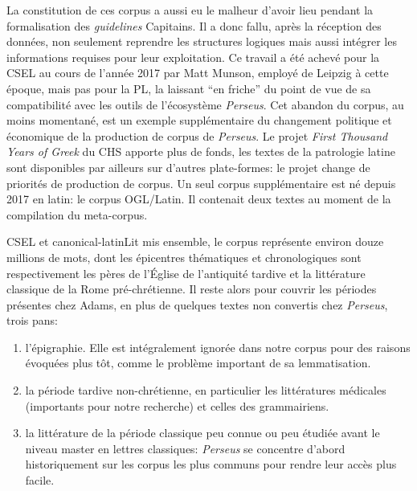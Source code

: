 La constitution de ces corpus a aussi eu le malheur d'avoir lieu pendant la formalisation des \textit{guidelines} Capitains. Il a donc fallu, après la réception des données, non seulement reprendre les structures logiques mais aussi intégrer les informations requises pour leur exploitation. Ce travail a été achevé pour la CSEL au cours de l'année 2017 par Matt Munson, employé de Leipzig à cette époque, mais pas pour la PL, la laissant \enquote{en friche} du point de vue de sa compatibilité avec les outils de l'écosystème \textit{Perseus}. Cet abandon du corpus, au moins momentané, est un exemple supplémentaire du changement politique et économique de la production de corpus de \textit{Perseus}. Le projet \textit{First Thousand Years of Greek} du CHS apporte plus de fonds, les textes de la patrologie latine sont disponibles par ailleurs sur d'autres plate-formes: le projet change de priorités de production de corpus. Un seul corpus supplémentaire est né depuis 2017 en latin: le corpus OGL/Latin. Il contenait deux textes au moment de la compilation du meta-corpus.

CSEL et canonical-latinLit mis ensemble, le corpus représente environ douze millions de mots, dont les épicentres thématiques et chronologiques sont respectivement les pères de l'Église de l'antiquité tardive et la littérature classique de la Rome pré-chrétienne. Il reste alors pour couvrir les périodes présentes chez Adams, en plus de quelques textes non convertis chez \textit{Perseus}, trois pans:

\begin{enumerate}
    \item l'épigraphie. Elle est intégralement ignorée dans notre corpus pour des raisons évoquées plus tôt, comme le problème important de sa lemmatisation.
    \item la période tardive non-chrétienne, en particulier les littératures médicales (importants pour notre recherche) et celles des grammairiens.
    \item la littérature de la période classique peu connue ou peu étudiée avant le niveau master en lettres classiques: \textit{Perseus} se concentre d'abord historiquement sur les corpus les plus communs pour rendre leur accès plus facile. 
\end{enumerate}

